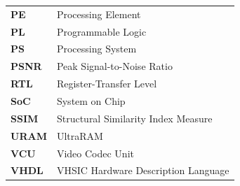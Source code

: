 \begin{center}
\begin{tabular}{p{} p{}}
\textbf{PE} & Processing Element \\
\textbf{PL} & Programmable Logic \\
\textbf{PS} & Processing System \\
\textbf{PSNR} & Peak Signal-to-Noise Ratio \\
\textbf{RTL} & Register-Transfer Level \\
\textbf{SoC} & System on Chip \\
\textbf{SSIM} & Structural Similarity Index Measure \\
\textbf{URAM} & UltraRAM \\
\textbf{VCU} & Video Codec Unit \\
\textbf{VHDL} & VHSIC Hardware Description Language \\
\end{tabular}
\end{center}

\cleardoublepage